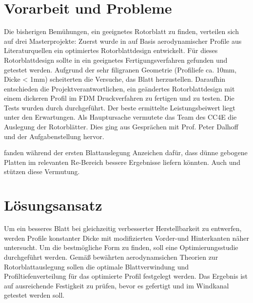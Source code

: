 \section{Vorarbeit und Probleme}
Die bisherigen Bemühungen, ein geeignetes Rotorblatt zu finden, verteilen sich auf drei Masterprojekte: Zuerst wurde in \cite{buchholz_erarbeitung_2020} auf Basis aerodynamischer Profile aus Literaturquellen ein optimiertes Rotorblattdesign entwickelt. Für dieses Rotorblattdesign sollte in \cite{stolla_konstruktion_2020} ein geeignetes Fertigungsverfahren gefunden und getestet werden. Aufgrund der sehr filigranen Geometrie (Profiliefe ca. 10mm, Dicke < 1mm) scheiterten die Versuche, das Blatt herzustellen. Daraufhin entschieden die Projektverantwortlichen, ein geändertes Rotorblattdesign mit einem dickeren Profil im FDM Druckverfahren zu fertigen und zu testen. Die Tests wurden durch \textcite{loof_windkanaluntersuchungen_2023} durchgeführt. Der beste ermittelte Leistungsbeiwert liegt unter den Erwartungen. Als Hauptursache vermutete das Team des CC4E die Auslegung der Rotorblätter. Dies ging aus Gesprächen mit Prof. Peter Dalhoff und der Aufgabenstellung hervor.

\textcite{buchholz_erarbeitung_2020} fanden während der ersten Blattauslegung Anzeichen dafür, dass dünne gebogene Platten im relevanten Re-Bereich bessere Ergebnisse liefern könnten. Auch \textcite{liu_optimization_2014} und \textcite{bastankhah_new_2017} stützen diese Vermutung.

\section{Lösungsansatz}
Um ein besseres Blatt bei gleichzeitig verbesserter Herstellbarkeit zu entwerfen, werden Profile konstanter Dicke mit modifizierten Vorder-und Hinterkanten näher untersucht. Um die bestmögliche Form zu finden, soll eine Optimierungsstudie durchgeführt werden. Gemäß bewährten aerodynamsichen Theorien zur Rotorblattauslegung sollen die optimale Blattverwindung und Profiltiefenverteilung für das optimierte Profil festgelegt werden. Das Ergebnis ist auf ausreichende Festigkeit zu prüfen, bevor es gefertigt und im Windkanal getestet werden soll.